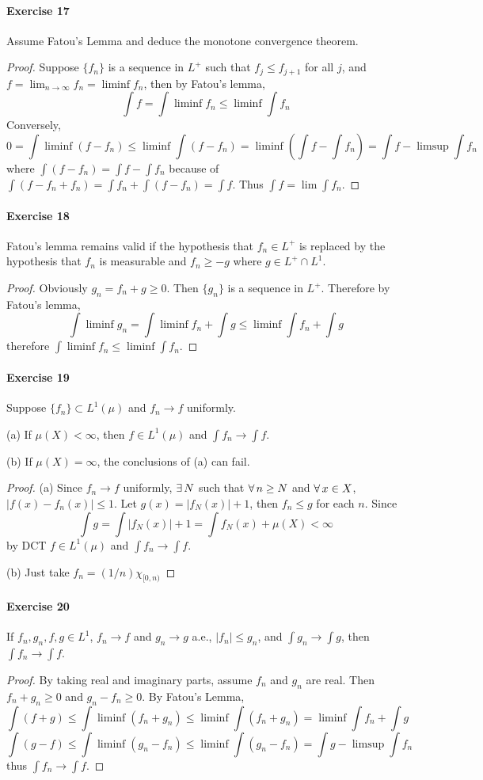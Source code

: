 \paragraph{Exercise 17}
Assume Fatou's Lemma and deduce the monotone convergence theorem.
\begin{proof}
    Suppose $\{f_n\}$ is a sequence in $L^+$ such that $f_j\le f_{j+1}$ for all $j$, and $f=\lim_{n\to\infty}f_n=\liminf f_n$, then by Fatou's lemma,
    $$
    \int f=\int\liminf f_n\le\liminf\int f_n
    $$
    Conversely,
    $$
    0=\int\liminf(f- f_n)\le\liminf\int (f-f_n)=\liminf(\int f-\int f_n)=\int f-\limsup\int f_n
    $$
    where $\int (f-f_n)=\int f-\int f_n$ because of $\int(f-f_n+f_n)=\int f_n+\int (f-f_n)=\int f$. Thus $\int f=\lim\int f_n$.
\end{proof}
\paragraph{Exercise 18}
Fatou's lemma remains valid if the hypothesis that $f_n\in L^+$ is replaced by the hypothesis that $f_n$ is measurable and $f_n\ge -g$ where $g\in L^+\cap L^1$.
\begin{proof}
    Obviously $g_n=f_n+g\ge 0$. Then $\{g_n\}$ is a sequence in $L^+$. Therefore by Fatou's lemma,
    $$
    \int\liminf g_n=\int\liminf f_n+\int g\le\liminf\int f_n+\int g
    $$
    therefore $\int\liminf f_n\le\liminf\int f_n$.
\end{proof}
\paragraph{Exercise 19}
Suppose $\{f_n\}\subset L^1(\mu)$ and $f_n\to f$ uniformly.
\par (a) If $\mu(X)<\infty$, then $f\in L^1(\mu)$ and $\int f_n\to\int f$.
\par (b) If $\mu(X)=\infty$, the conclusions of (a) can fail.
\begin{proof}
    (a) Since $f_n\to f$ uniformly, $\exists\, N$ such that $\forall\, n\ge N$ and $\forall\, x\in X$, $|f(x)-f_n(x)|\le1$. Let $g(x)=|f_N(x)|+1$, then $f_n\le g$ for each $n$. Since
    $$
    \int g=\int|f_N(x)|+1=\int f_N(x)+\mu(X)<\infty
    $$
    by DCT $f\in L^1(\mu)$ and $\int f_n\to\int f$.
    \par (b) Just take $f_n=(1/n)\chi_{[0,n)}$
\end{proof}
\paragraph{Exercise 20}
If $f_n,g_n,f,g\in L^1$, $f_n\to f$ and $g_n\to g$ a.e., $|f_n|\le g_n$, and $\int g_n\to\int g$, then $\int f_n\to\int f$.
\begin{proof}
    By taking real and imaginary parts, assume $f_n$ and $g_n$ are real. Then $f_n+g_n\ge 0$ and $g_n-f_n\ge 0$. By Fatou's Lemma,
    $$
    \int(f+g)\le\int\liminf (f_n+g_n)\le\liminf\int(f_n+g_n)=\liminf\int f_n+\int g
    $$
    $$
    \int(g-f)\le\int\liminf (g_n-f_n)\le\liminf\int(g_n-f_n)=\int g-\limsup\int f_n
    $$
    thus $\int f_n\to\int f$.
\end{proof}
